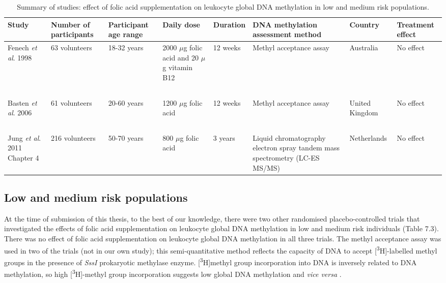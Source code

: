\begin{sidewaystable}
\footnotesize
\caption{Summary of studies: effect of folic acid supplementation on leukocyte global DNA methylation in low and medium risk populations.} 
\label{table7_3}
\begin{adjustbox}{width=\textwidth}
\begin{tabular}{L{1.5cm}C{1.6cm}C{1.6cm}C{1.8cm}C{1.5cm}C{3.5cm}C{1.5cm}C{1.8cm}} 
\hline
\bfseries Study & \bfseries Number of participants & \bfseries Participant age range & \bfseries Daily dose & \bfseries Duration & \bfseries DNA methylation assessment method & \bfseries Country & \bfseries Treatment effect\\
\hline
Fenech \textit{et al}. 1998 \cite{c796} & 63 volunteers & 18-32 years & 2000 $\mu$g folic acid and 20 $\mu$g vitamin B12 & 12 weeks & Methyl acceptance assay & Australia & No effect\\

~ & ~ & ~ & ~ & ~ & ~ & ~ & ~\\

Basten \textit{et al}. 2006 \cite{c797} & 61 volunteers & 20-60 years & 1200 $\mu$g folic acid & 12 weeks & Methyl acceptance assay & United Kingdom & No effect\\

~ & ~ & ~ & ~ & ~ & ~ & ~ & ~\\

{Jung \textit{et al}. 2011 \cite{c798}} Chapter 4 & 216 volunteers & 50-70 years & 800 $\mu$g folic acid & 3 years & Liquid chromatography electron spray 
tandem mass spectrometry (LC-ES MS/MS) & Netherlands & No effect\\
\hline
\end{tabular}
\end{adjustbox}
\end{sidewaystable} 

\subsection{Low and medium risk populations} %
\noindent At the time of submission of this thesis, to the best of our knowledge, there were two other randomised placebo-controlled trials that investigated the effects of folic acid supplementation on leukocyte global DNA methylation in low and medium risk individuals (Table 7.3). There was no effect of folic acid supplementation on leukocyte global DNA methylation in all three trials. The methyl acceptance assay was used in two of the trials (not in our own study); this semi-quantitative method reflects the capacity of DNA to accept [\textsuperscript{3}H]-labelled methyl groups in the presence of \emph{SssI} prokaryotic methylase enzyme. [\textsuperscript{3}H]methyl group incorporation into DNA is inversely related to DNA methylation, so high [\textsuperscript{3}H]-methyl group incorporation suggests low global DNA methylation and \emph{vice versa} \cite{c71}. 

